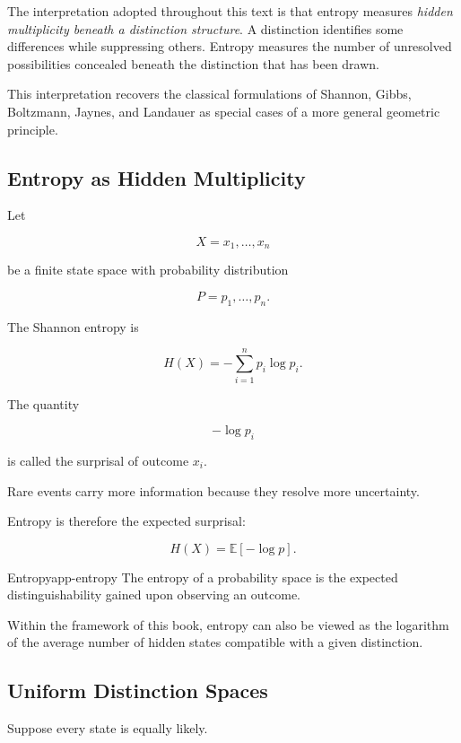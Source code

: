 \documentclass[12pt,twoside,openright]{book}
\begin{document}
The interpretation adopted throughout this text is that
entropy measures \emph{hidden multiplicity beneath a
distinction structure}. A distinction identifies some
differences while suppressing others. Entropy measures the
number of unresolved possibilities concealed beneath the
distinction that has been drawn.

This interpretation recovers the classical formulations
of Shannon, Gibbs, Boltzmann, Jaynes, and Landauer as
special cases of a more general geometric principle.

\subsection{Entropy as Hidden Multiplicity}

Let

\[
X
=

{x_1,\ldots,x_n}
\]

be a finite state space with probability distribution

\[
P
=

{p_1,\ldots,p_n}.
\]

The Shannon entropy is

\[
H(X)
=

-\sum_{i=1}^{n}
p_i\log p_i.
\]

The quantity

\[
-\log p_i
\]

is called the surprisal of outcome
$x_i$.

Rare events carry more information because they resolve
more uncertainty.

Entropy is therefore the expected surprisal:

\[
H(X)
=

\mathbb E[-\log p].
\]

\begin{definition}{Entropy}{app-entropy}
The entropy of a probability space is the expected
distinguishability gained upon observing an outcome.
\end{definition}

Within the framework of this book, entropy can also be
viewed as the logarithm of the average number of hidden
states compatible with a given distinction.

\subsection{Uniform Distinction Spaces}

Suppose every state is equally likely.
\end{document}
